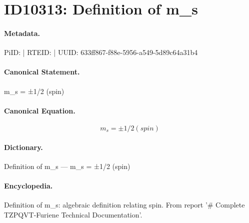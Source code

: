 \section*{ID10313: Definition of m\_s}
\paragraph{Metadata.}
PiID:  | RTEID:  | UUID: 633ff867-f88e-5956-a549-5d89c64a31b4

\paragraph{Canonical Statement.}
m\_s = ±1/2 (spin)

\paragraph{Canonical Equation.}
\[
m_s = ±1/2 (spin)
\]

\paragraph{Dictionary.}
Definition of m\_s — m\_s = ±1/2 (spin)

\paragraph{Encyclopedia.}
Definition of m\_s: algebraic definition relating spin. From report '\# Complete TZPQVT-Furiene Technical Documentation'.
